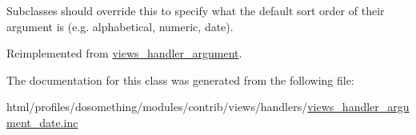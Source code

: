 Subclasses should override this to specify what the default sort order of their argument is (e.g. alphabetical, numeric, date). 

Reimplemented from \hyperlink{classviews__handler__argument_a9fad9ab1a7aaa5915baf13a2872faa70}{views\_\-handler\_\-argument}.

The documentation for this class was generated from the following file:\begin{DoxyCompactItemize}
\item 
html/profiles/dosomething/modules/contrib/views/handlers/\hyperlink{views__handler__argument__date_8inc}{views\_\-handler\_\-argument\_\-date.inc}\end{DoxyCompactItemize}
